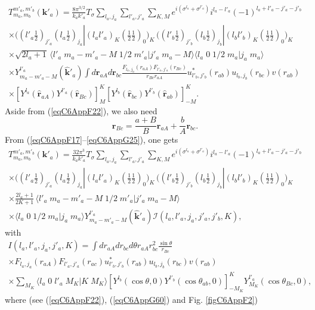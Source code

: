 \begin{multline}\label{eqC6AppG59}
T_{m_a,m_b}^{m'_a,m'_b}(\mathbf{k}'_a)=\frac{8\pi^{3/2}}{k_ak'_a}T_{\sigma}\sum_{l_a,j_a}\sum_{l'_a,j'_a}\sum_{K,M}
 e^{i(\sigma^{l_a}+\sigma^{l'_a})}i^{l_a-l'_a}(-1)^{l_a+l'_a-j'_a-j'_b}\\
 \times\bigl((l'_a \tfrac{1}{2})_{j'_a}(l_a \tfrac{1}{2})_{j_a}|(l_a l'_a)_K(\tfrac{1}{2} \tfrac{1}{2})_0\bigr)_K\,\bigl((l'_b \tfrac{1}{2})_{j'_b}(l_b \tfrac{1}{2})_{j_b}|(l_b l'_b)_{K}(\tfrac{1}{2} \tfrac{1}{2})_0\bigr)_{K}\\
\times \sqrt{2l_a+1}\,\langle l'_a\;m_a-m'_a-M\;1/2\;m'_a|j'_a\;m_a-M\rangle \langle l_a\;0\;1/2\;m_a|j_a\;m_a\rangle\\
\times Y^{l'_a}_{m_a-m'_a-M} (\hat {\mathbf{k}}'_a)
\int d\mathbf{r}_{aA}d \mathbf{r}_{bc}\frac{F_{l_a,j_a}(r_{aA})  F_{l'_a,j'_a}(r_{Bc})}{r_{Bc}r_{aA}}u^*_{l'_b,j'_b}(r_{ab})u_{l_b,j_b}(r_{bc})v(r_{ab})\\
\times\left[ Y^{l_a} (\hat{\mathbf r}_{aA}) Y^{l'_a} (\hat{ \mathbf r}_{Bc})\right]^K_{M}   \left[ Y^{l_b} (\hat{\mathbf r}_{bc}) Y^{l'_b} (\hat{\mathbf r}_{ab})\right]^{K}_{-M}.
\end{multline}
Aside from (\ref{eqC6AppF22}), we also need 
\begin{equation}\label{eqC6AppG60}
\mathbf{r}_{Bc}=\frac{a+B}{B}\mathbf{r}_{aA}+\frac{b}{A}\mathbf{r}_{bc}.
\end{equation}
From (\ref{eqC6AppF17}--\ref{eqC6AppG25}), one gets
\begin{multline}\label{eqC6AppG61}
T_{m_a,m_b}^{m'_a,m'_b}(\mathbf{k}'_a)=\frac{32\pi^{3}}{k_ak'_a}T_{\sigma}\sum_{l_a,j_a}\sum_{l'_a,j'_a}\sum_{K,M}
 e^{i(\sigma^{l_a}+\sigma^{l'_a})}i^{l_a-l'_a}(-1)^{l_a+l'_a-j'_a-j'_b}\\
 \times\bigl((l'_a \tfrac{1}{2})_{j'_a}(l_a \tfrac{1}{2})_{j_a}|(l_a l'_a)_K(\tfrac{1}{2} \tfrac{1}{2})_0\bigr)_K\,\bigl((l'_b \tfrac{1}{2})_{j'_b}(l_b \tfrac{1}{2})_{j_b}|(l_b l'_b)_{K}(\tfrac{1}{2} \tfrac{1}{2})_0\bigr)_{K}\\
\times \frac{2l_a+1}{2K+1}\,\langle l'_a\;m_a-m'_a-M\;1/2\;m'_a|j'_a\;m_a-M\rangle\\ \times\langle l_a\;0\;1/2\;m_a|j_a\;m_a\rangle
 Y^{l'_a}_{m_a-m'_a-M} (\hat {\mathbf{k}}'_a)
\mathcal I(l_a,l'_a,j_a,j'_a,j'_b,K),
\end{multline}
with
\begin{multline}\label{eqC6AppG62}
I(l_a,l'_a,j_a,j'_a,K)=\int dr_{aA} dr_{bc}d\theta r_{aA}r^2_{bc} \frac{\sin \theta}{r_{Bc}}\\
\times F_{l_a,j_a}(r_{aA})  F_{l'_a,j'_a}(r_{ac})u^*_{l'_b,j'_b}(r_{ab}) u_{l_b,j_b}(r_{bc})v(r_{ab}) \\
\times \sum_{M_K} \langle l_a\;0\;l'_a\;M_K|K\;M_K\rangle \left[ Y^{l_b} (\cos \theta,0) Y^{l'_b} (\cos \theta_{ab},0)\right]^{K}_{-M_K} Y^{l'_a}_{M_K} (\cos \theta_{Bc},0),
\end{multline}
where (see (\ref{eqC6AppF22}), (\ref{eqC6AppG60}) and Fig. \ref{figC6AppF2})

